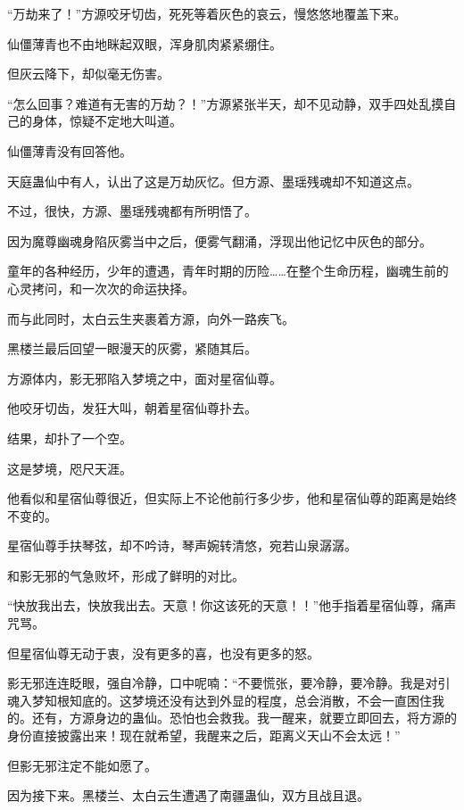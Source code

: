 
\begin{this_body}

“万劫来了！”方源咬牙切齿，死死等着灰色的哀云，慢悠悠地覆盖下来。

仙僵薄青也不由地眯起双眼，浑身肌肉紧紧绷住。

但灰云降下，却似毫无伤害。

“怎么回事？难道有无害的万劫？！”方源紧张半天，却不见动静，双手四处乱摸自己的身体，惊疑不定地大叫道。

仙僵薄青没有回答他。

天庭蛊仙中有人，认出了这是万劫灰忆。但方源、墨瑶残魂却不知道这点。

不过，很快，方源、墨瑶残魂都有所明悟了。

因为魔尊幽魂身陷灰雾当中之后，便雾气翻涌，浮现出他记忆中灰色的部分。

童年的各种经历，少年的遭遇，青年时期的历险……在整个生命历程，幽魂生前的心灵拷问，和一次次的命运抉择。

而与此同时，太白云生夹裹着方源，向外一路疾飞。

黑楼兰最后回望一眼漫天的灰雾，紧随其后。

方源体内，影无邪陷入梦境之中，面对星宿仙尊。

他咬牙切齿，发狂大叫，朝着星宿仙尊扑去。

结果，却扑了一个空。

这是梦境，咫尺天涯。

他看似和星宿仙尊很近，但实际上不论他前行多少步，他和星宿仙尊的距离是始终不变的。

星宿仙尊手扶琴弦，却不吟诗，琴声婉转清悠，宛若山泉潺潺。

和影无邪的气急败坏，形成了鲜明的对比。

“快放我出去，快放我出去。天意！你这该死的天意！！”他手指着星宿仙尊，痛声咒骂。

但星宿仙尊无动于衷，没有更多的喜，也没有更多的怒。

影无邪连连眨眼，强自冷静，口中呢喃：“不要慌张，要冷静，要冷静。我是对引魂入梦知根知底的。这梦境还没有达到外显的程度，总会消散，不会一直困住我的。还有，方源身边的蛊仙。恐怕也会救我。我一醒来，就要立即回去，将方源的身份直接披露出来！现在就希望，我醒来之后，距离义天山不会太远！”

但影无邪注定不能如愿了。

因为接下来。黑楼兰、太白云生遭遇了南疆蛊仙，双方且战且退。


\end{this_body}
